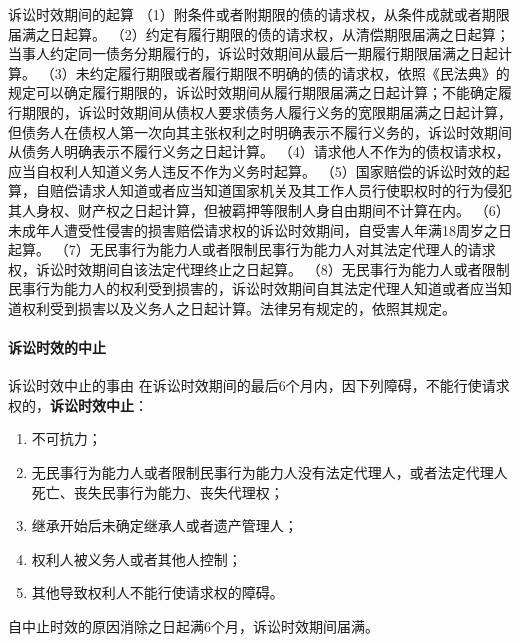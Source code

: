 \documentclass[UTF8,12pt]{ctexart}
\numberwithin{equation}{section} %
\numberwithin{figure}{section}
\numberwithin{table}{section}
\begin{document}
	诉讼时效期间的起算
	（1）附条件或者附期限的债的请求权，从条件成就或者期限届满之日起算。
	（2）约定有履行期限的债的请求权，从清偿期限届满之日起算；当事人约定同一债务分期履行的，诉讼时效期间从最后一期履行期限届满之日起计算。
	（3）未约定履行期限或者履行期限不明确的债的请求权，依照《民法典》的规定可以确定履行期限的，诉讼时效期间从履行期限届满之日起计算；不能确定履行期限的，诉讼时效期间从债权人要求债务人履行义务的宽限期届满之日起计算，但债务人在债权人第一次向其主张权利之时明确表示不履行义务的，诉讼时效期间从债务人明确表示不履行义务之日起计算。
	（4）请求他人不作为的债权请求权，应当自权利人知道义务人违反不作为义务时起算。
	（5）国家赔偿的诉讼时效的起算，自赔偿请求人知道或者应当知道国家机关及其工作人员行使职权时的行为侵犯其人身权、财产权之日起计算，但被羁押等限制人身自由期间不计算在内。
	（6）未成年人遭受性侵害的损害赔偿请求权的诉讼时效期间，自受害人年满18周岁之日起算。
	（7）无民事行为能力人或者限制民事行为能力人对其法定代理人的请求权，诉讼时效期间自该法定代理终止之日起算。
	（8）无民事行为能力人或者限制民事行为能力人的权利受到损害的，诉讼时效期间自其法定代理人知道或者应当知道权利受到损害以及义务人之日起计算。法律另有规定的，依照其规定。
	
	\paragraph{诉讼时效的中止}
	诉讼时效中止的事由
	在诉讼时效期间的最后6个月内，因下列障碍，不能行使请求权的，\textbf{诉讼时效中止}：
	\begin{enumerate}
		\item 不可抗力；
		
		\item 无民事行为能力人或者限制民事行为能力人没有法定代理人，或者法定代理人死亡、丧失民事行为能力、丧失代理权；
		
		\item 继承开始后未确定继承人或者遗产管理人；
		
		\item 权利人被义务人或者其他人控制；
		
		\item 其他导致权利人不能行使请求权的障碍。
	\end{enumerate}
	
	自中止时效的原因消除之日起满6个月，诉讼时效期间届满。
	
\end{document}
